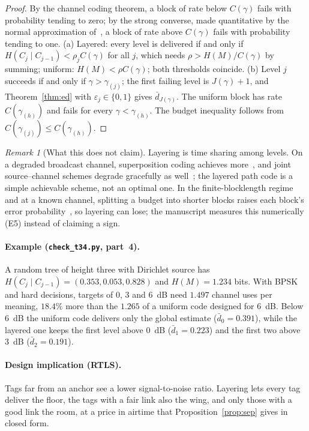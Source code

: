 \documentclass[11pt]{article}
\theoremstyle{definition}
\theoremstyle{remark}
\newtheorem{remark}{Remark}
\begin{document}
\begin{proof}
By the channel coding theorem, a block of rate below $C(\gamma)$ fails with probability tending to zero; by the strong converse, made quantitative by the normal approximation of~\cite{polyanskiy2010}, a block of rate above $C(\gamma)$ fails with probability tending to one. (a) Layered: every level is delivered if and only if $H(C_j\mid C_{j-1})<\rho_jC(\gamma)$ for all $j$, which needs $\rho>H(M)/C(\gamma)$ by summing; uniform: $H(M)<\rho C(\gamma)$; both thresholds coincide. (b) Level $j$ succeeds if and only if $\gamma>\gamma_{(j)}$; the first failing level is $J(\gamma)+1$, and Theorem~\ref{thm:ed} with $\varepsilon_j\in\{0,1\}$ gives $\bar d_{J(\gamma)}$. The uniform block has rate $C(\gamma_{(h)})$ and fails for every $\gamma<\gamma_{(h)}$. The budget inequality follows from $C(\gamma_{(j)})\le C(\gamma_{(h)})$.
\end{proof}

\begin{remark}[What this does not claim]
Layering is time sharing among levels. On a degraded broadcast channel, superposition coding achieves more~\cite{cover1972}, and joint source--channel schemes degrade gracefully as well~\cite{mittal2002,shamai1998}; the layered path code is a simple achievable scheme, not an optimal one. In the finite-blocklength regime and at a known channel, splitting a budget into shorter blocks raises each block's error probability~\cite{polyanskiy2010,kostina2013}, so layering can lose; the manuscript measures this numerically (E5) instead of claiming a sign.
\end{remark}

\paragraph{Example (\texttt{check\_t34.py}, part~4).} A random tree of height three with Dirichlet source has $H(C_j\mid C_{j-1})=(0.353,0.053,0.828)$ and $H(M)=1.234$ bits. With BPSK and hard decisions, targets of $0$, $3$ and $6$~dB need $1.497$ channel uses per meaning, $18.4\%$ more than the $1.265$ of a uniform code designed for $6$~dB. Below $6$~dB the uniform code delivers only the global estimate ($\bar d_0=0.391$), while the layered one keeps the first level above $0$~dB ($\bar d_1=0.223$) and the first two above $3$~dB ($\bar d_2=0.191$).

\paragraph{Design implication (RTLS).} Tags far from an anchor see a lower signal-to-noise ratio. Layering lets every tag deliver the floor, the tags with a fair link also the wing, and only those with a good link the room, at a price in airtime that Proposition~\ref{prop:sep} gives in closed form.
\end{document}
